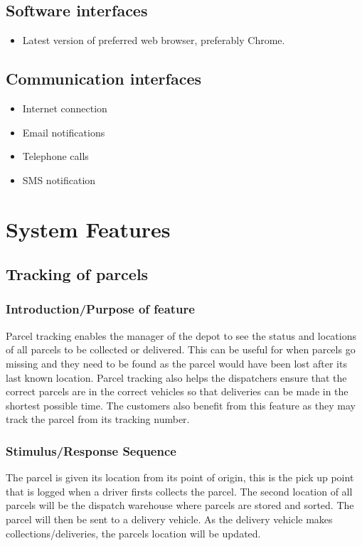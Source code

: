\documentclass[paper=a4, fontsize=11pt]{scrartcl} %
\numberwithin{equation}{section} %
\numberwithin{figure}{section} %
\numberwithin{table}{section} %
\begin{document}
\subsection{Software interfaces}
	\begin{itemize}
		\item Latest version of preferred web browser, preferably Chrome.
	\end{itemize}
\subsection{Communication interfaces}
	\begin{itemize}
		\item Internet connection
		\item Email notifications
		\item Telephone calls
		\item SMS notification
	\end{itemize}

\section{System Features}


\subsection{Tracking of parcels}
\subsubsection{Introduction/Purpose of feature}

Parcel tracking enables the manager of the depot to see the status and locations of all parcels to be collected or delivered. This can be useful for when parcels go missing and they need to be found as the parcel would have been lost after its last known location. Parcel tracking also helps the dispatchers ensure that the correct parcels are in the correct vehicles so that deliveries can be made in the shortest possible time. The customers also benefit from this feature as they may track the parcel from its tracking number.
\subsubsection{Stimulus/Response Sequence}
The parcel is given its location  from its point of origin, this is the pick up point that is logged when a driver firsts collects the parcel. The second location of all parcels will be the dispatch warehouse where parcels are stored and sorted. The parcel will then be sent to a delivery vehicle. As the delivery vehicle makes collections/deliveries, the parcels location will be updated. 
\end{document}
